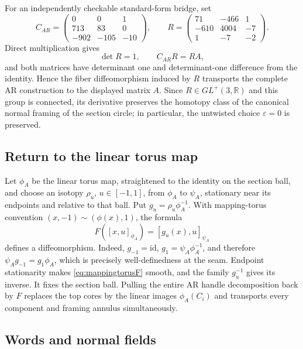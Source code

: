 For an independently checkable standard-form bridge, set
\[
C_{AR}=\begin{pmatrix}0&0&1\\713&83&0\\-902&-105&-10\end{pmatrix},
\qquad
R=\begin{pmatrix}71&-466&1\\-610&4004&-7\\1&-7&-2\end{pmatrix}.
\]
Direct multiplication gives
\[
\det R=1,\qquad C_{AR}R=RA,
\]
and both matrices have determinant one and determinant-one difference from
the identity.  Hence the fiber diffeomorphism induced by $R$ transports the
complete AR construction to the displayed matrix $A$.  Since
$R\in GL^+(3,\mathbb R)$ and this group is connected, its derivative preserves
the homotopy class of the canonical normal framing of the section circle; in
particular, the untwisted choice $\varepsilon=0$ is preserved.

\subsection{Return to the linear torus map}

Let $\phi_A$ be the linear torus map, straightened to the identity on the
section ball, and choose an isotopy $\rho_u$, $u\in[-1,1]$, from $\phi_A$ to
$\psi_A$, stationary near its endpoints and relative to that ball.  Put
$g_u=\rho_u\phi_A^{-1}$.  With mapping-torus convention
$(x,-1)\sim(\phi(x),1)$, the formula
\begin{equation}\label{eq:mappingtorusF}
F([x,u]_{\phi_A})=[g_u(x),u]_{\psi_A}
\end{equation}
defines a diffeomorphism.  Indeed, $g_{-1}=\mathrm{id}$,
$g_1=\psi_A\phi_A^{-1}$, and therefore
$\psi_Ag_{-1}=g_1\phi_A$, which is precisely well-definedness at the seam.
Endpoint stationarity makes \eqref{eq:mappingtorusF} smooth, and the family
$g_u^{-1}$ gives its inverse.  It fixes the section ball.  Pulling the entire
AR handle decomposition back by $F$ replaces the top cores by the linear
images $\phi_A(C_i)$ and transports every component and framing annulus
simultaneously.

\subsection{Words and normal fields}

